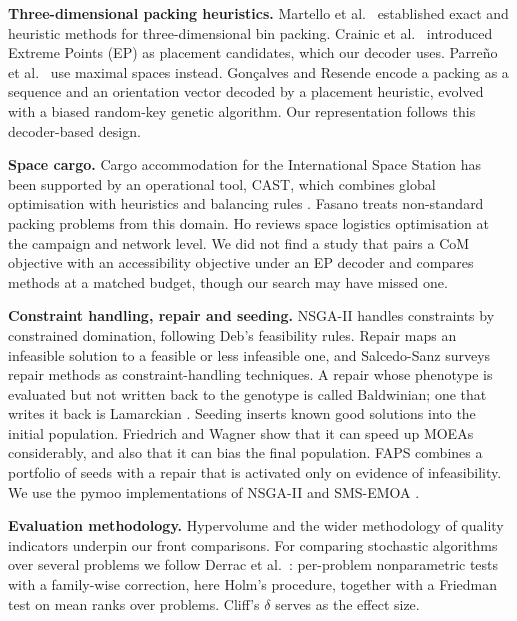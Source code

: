 \documentclass[journal]{IEEEtran}
\begin{document}
\textbf{Three-dimensional packing heuristics.} Martello et al.~\cite{martello2000} established exact and heuristic methods for three-dimensional bin packing. Crainic et al.~\cite{crainic2008} introduced Extreme Points (EP) as placement candidates, which our decoder uses. Parreño et al.~\cite{parreno2008} use maximal spaces instead. Gonçalves and Resende \cite{goncalves2013} encode a packing as a sequence and an orientation vector decoded by a placement heuristic, evolved with a biased random-key genetic algorithm. Our representation follows this decoder-based design.

\textbf{Space cargo.} Cargo accommodation for the International Space Station has been supported by an operational tool, CAST, which combines global optimisation with heuristics and balancing rules \cite{fasano2015}. Fasano \cite{fasano2014} treats non-standard packing problems from this domain. Ho \cite{ho2023} reviews space logistics optimisation at the campaign and network level. We did not find a study that pairs a CoM objective with an accessibility objective under an EP decoder and compares methods at a matched budget, though our search may have missed one.

\textbf{Constraint handling, repair and seeding.} NSGA-II \cite{deb2002} handles constraints by constrained domination, following Deb's \cite{deb2000} feasibility rules. Repair maps an infeasible solution to a feasible or less infeasible one, and Salcedo-Sanz \cite{salcedo2009} surveys repair methods as constraint-handling techniques. A repair whose phenotype is evaluated but not written back to the genotype is called Baldwinian; one that writes it back is Lamarckian \cite{whitley1994}. Seeding inserts known good solutions into the initial population. Friedrich and Wagner \cite{friedrich2015} show that it can speed up MOEAs considerably, and also that it can bias the final population. FAPS combines a portfolio of seeds with a repair that is activated only on evidence of infeasibility. We use the pymoo implementations of NSGA-II and SMS-EMOA \cite{blank2020}.

\textbf{Evaluation methodology.} Hypervolume \cite{zitzler1999} and the wider methodology of quality indicators \cite{zitzler2003} underpin our front comparisons. For comparing stochastic algorithms over several problems we follow Derrac et al.~\cite{derrac2011}: per-problem nonparametric tests with a family-wise correction, here Holm's \cite{holm1979} procedure, together with a Friedman test on mean ranks over problems. Cliff's \cite{cliff1993} \(\delta\) serves as the effect size.
\end{document}
